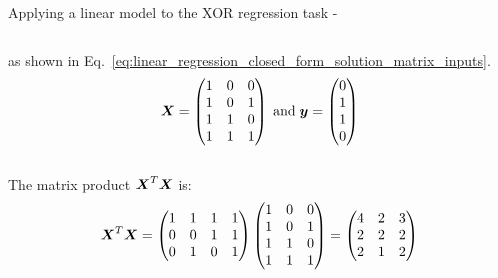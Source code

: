 \begin{frame}[t,allowframebreaks]{Applying a linear model to the XOR regression task -}
\begin{columns}[t]
\begin{column}{0.56\textwidth}
            as shown in Eq.~\ref{eq:linear_regression_closed_form_solution_matrix_inputs}.
            \begin{equation}
                \boldsymbol{X} = 
                \begin{pmatrix}
                    1 & 0 & 0 \\
                    1 & 0 & 1 \\
                    1 & 1 & 0 \\
                    1 & 1 & 1 \\
                \end{pmatrix} 
                \; \textrm{and} \;
                \boldsymbol{y} = 
                \begin{pmatrix}
                    0 \\
                    1 \\
                    1 \\
                    0 \\
                \end{pmatrix} 
            \end{equation}        
        \end{column}
    \end{columns}

    \framebreak


    The matrix product $\boldsymbol{X}^T \boldsymbol{X}$ is:\\
    \vspace{-0.3cm}
    \begin{equation}
        \boldsymbol{X}^T \boldsymbol{X} = 
        \begin{pmatrix}
            1 & 1 & 1 & 1 \\
            0 & 0 & 1 & 1 \\
            0 & 1 & 0 & 1 \\
        \end{pmatrix} 
        \begin{pmatrix}
            1 & 0 & 0 \\
            1 & 0 & 1 \\
            1 & 1 & 0 \\
            1 & 1 & 1 \\
        \end{pmatrix} =
        \begin{pmatrix}
            4 & 2 & 3 \\
            2 & 2 & 2 \\
            2 & 1 & 2 \\
        \end{pmatrix} 
    \end{equation}        


\end{frame}
